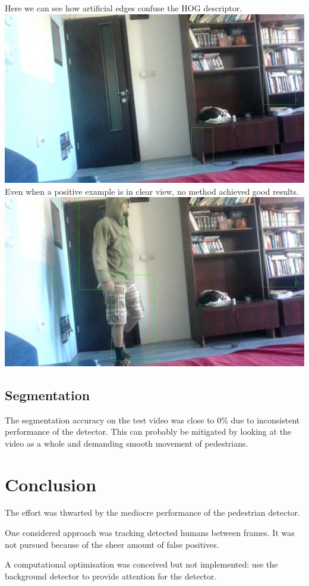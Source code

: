 \documentclass{article}
\begin{document}
Here we can see how artificial edges confuse the HOG descriptor.
\\
\includegraphics[height=0.5\textheight]{../img/false-positives}
\\
Even when a positive example is in clear view, no method achieved good results.
\\
\includegraphics[height=0.5\textheight]{../img/pedestrian}
\\

\subsection{Segmentation}
The segmentation accuracy on the test video was close to 0\% due to inconsistent performance of the detector.
This can probably be mitigated by looking at the video as a whole and demanding smooth movement of pedestrians.


\section{Conclusion}
The effort was thwarted by the mediocre performance of the pedestrian detector.

One considered approach was tracking detected humans between frames.
It was not pursued because of the sheer amount of false positives.

A computational optimisation was conceived but not implemented: use the background detector to provide attention for the detector.


\printbibliography
\end{document}

